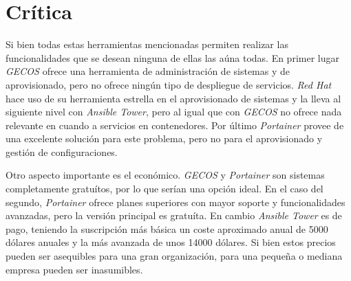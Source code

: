 \section{Crítica}

Si bien todas estas herramientas mencionadas permiten realizar las funcionalidades que se desean ninguna de ellas las aúna todas. En primer lugar \textit{GECOS} ofrece una herramienta de administración de sistemas y de aprovisionado, pero no ofrece ningún tipo de despliegue de servicios. \textit{Red Hat} hace uso de su herramienta estrella en el aprovisionado de sistemas y la lleva al siguiente nivel con \textit{Ansible Tower}, pero al igual que con \textit{GECOS} no ofrece nada relevante en cuando a servicios en contenedores. Por último \textit{Portainer} provee de una excelente solución para este problema, pero no para el aprovisionado y gestión de configuraciones.

Otro aspecto importante es el económico. \textit{GECOS} y \textit{Portainer} son sistemas completamente gratuítos, por lo que serían una opción ideal. En el caso del segundo, \textit{Portainer} ofrece planes superiores con mayor soporte y funcionalidades avanzadas, pero la versión principal es gratuíta. En cambio \textit{Ansible Tower} es de pago, teniendo la suscripción más básica un coste aproximado anual de 5000 dólares anuales y la más avanzada de unos 14000 dólares. Si bien estos precios pueden ser asequibles para una gran organización, para una pequeña o mediana empresa pueden ser inasumibles.

\pagebreak